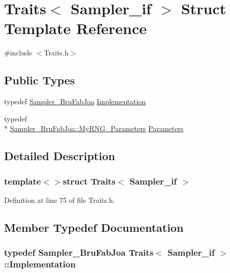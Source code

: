 \hypertarget{struct_traits_3_01_sampler__if_01_4}{\section{Traits$<$ Sampler\-\_\-if $>$ Struct Template Reference}
\label{struct_traits_3_01_sampler__if_01_4}
}


{\ttfamily \#include $<$Traits.\-h$>$}

\subsection*{Public Types}
\begin{DoxyCompactItemize}
\item 
typedef \hyperlink{class_sampler___bru_fab_joa}{Sampler\-\_\-\-Bru\-Fab\-Joa} \hyperlink{struct_traits_3_01_sampler__if_01_4_ac671b4707ba7d48439b364bdc9341a2e}{Implementation}
\item 
typedef \\*
\hyperlink{struct_sampler___bru_fab_joa_1_1_my_r_n_g___parameters}{Sampler\-\_\-\-Bru\-Fab\-Joa\-::\-My\-R\-N\-G\-\_\-\-Parameters} \hyperlink{struct_traits_3_01_sampler__if_01_4_a3e3228ca7fdd226d0a78be29ba406660}{Parameters}
\end{DoxyCompactItemize}


\subsection{Detailed Description}
\subsubsection*{template$<$$>$struct Traits$<$ Sampler\-\_\-if $>$}



Definition at line 75 of file Traits.\-h.



\subsection{Member Typedef Documentation}
\hypertarget{struct_traits_3_01_sampler__if_01_4_ac671b4707ba7d48439b364bdc9341a2e}{
\subsubsection[{Implementation}]{\setlength{\rightskip}{0pt plus 5cm}typedef {\bf Sampler\-\_\-\-Bru\-Fab\-Joa} {\bf Traits}$<$ {\bf Sampler\-\_\-if} $>$\-::{\bf Implementation}}}\label{struct_traits_3_01_sampler__if_01_4_ac671b4707ba7d48439b364bdc9341a2e}


